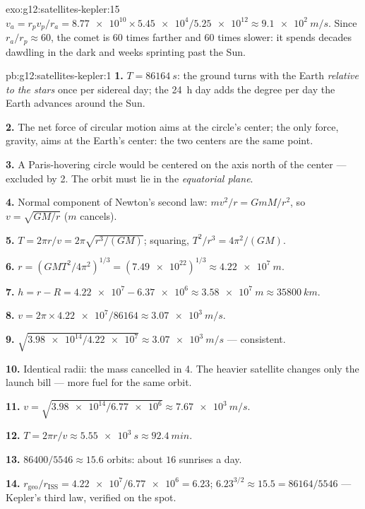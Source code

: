 \begin{solution}{exo:g12:satellites-kepler:15}
$v_a = r_p v_p / r_a = \num{8.77e10} \times \num{5.45e4} /
\num{5.25e12} \approx \qty{9.1e2}{m/s}$. Since $r_a/r_p \approx 60$,
the comet is $60$ times farther and $60$ times slower: it spends
decades dawdling in the dark and weeks sprinting past the Sun.
\end{solution}

\begin{solution}{pb:g12:satellites-kepler:1}
\textbf{1.} $T = \qty{86164}{s}$: the ground turns with the Earth
\emph{relative to the stars} once per sidereal day; the \qty{24}{h}
day adds the degree per day the Earth advances around the Sun.

\textbf{2.} The net force of circular motion aims at the circle's
center; the only force, gravity, aims at the Earth's center: the two
centers are the same point.

\textbf{3.} A Paris-hovering circle would be centered on the axis
north of the center --- excluded by 2. The orbit must lie in the
\emph{equatorial plane}.

\textbf{4.} Normal component of Newton's second law:
$m v^2/r = GmM/r^2$, so $v = \sqrt{GM/r}$ ($m$ cancels).

\textbf{5.} $T = 2\pi r/v = 2\pi\sqrt{r^3/(GM)}$; squaring,
$T^2/r^3 = 4\pi^2/(GM)$.

\textbf{6.} $r = \left(GMT^2/4\pi^2\right)^{1/3} =
(\num{7.49e22})^{1/3} \approx \qty{4.22e7}{m}$.

\textbf{7.} $h = r - R = \num{4.22e7} - \num{6.37e6} \approx
\qty{3.58e7}{m} \approx \qty{35800}{km}$.

\textbf{8.} $v = 2\pi \times \num{4.22e7}/\num{86164} \approx
\qty{3.07e3}{m/s}$.

\textbf{9.} $\sqrt{\num{3.98e14}/\num{4.22e7}} \approx
\qty{3.07e3}{m/s}$ --- consistent.

\textbf{10.} Identical radii: the mass cancelled in 4. The heavier
satellite changes only the launch bill --- more fuel for the same
orbit.

\textbf{11.} $v = \sqrt{\num{3.98e14}/\num{6.77e6}} \approx
\qty{7.67e3}{m/s}$.

\textbf{12.} $T = 2\pi r/v \approx \qty{5.55e3}{s} \approx
\qty{92.4}{min}$.

\textbf{13.} $\num{86400}/5546 \approx 15.6$ orbits: about $16$
sunrises a day.

\textbf{14.} $r_{\text{geo}}/r_{\text{ISS}} = \num{4.22e7}/\num{6.77e6}
= 6.23$; $6.23^{3/2} \approx 15.5 = \num{86164}/5546$ --- Kepler's
third law, verified on the spot.


\end{solution}
